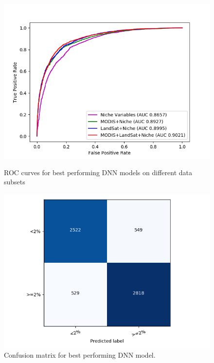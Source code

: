 \def\year{2017}\relax \documentclass[letterpaper]{article}
\begin{document}
\begin{figure}
\centering
\begin{minipage}{.48\textwidth}
  \centering
\includegraphics[width=\textwidth]{pics/roc.png}
\caption{ROC curves for best performing DNN models on different data subsets}
\end{minipage}
\begin{minipage}{.04\textwidth}
\end{minipage}
\begin{minipage}{.48\textwidth}
  \centering
\includegraphics[width=\textwidth]{pics/confusion_MODIS+LandSat+Niche.png}
\caption{Confusion matrix for best performing DNN model.}\label{confusion}
\end{minipage}
\end{figure}
\end{document}

